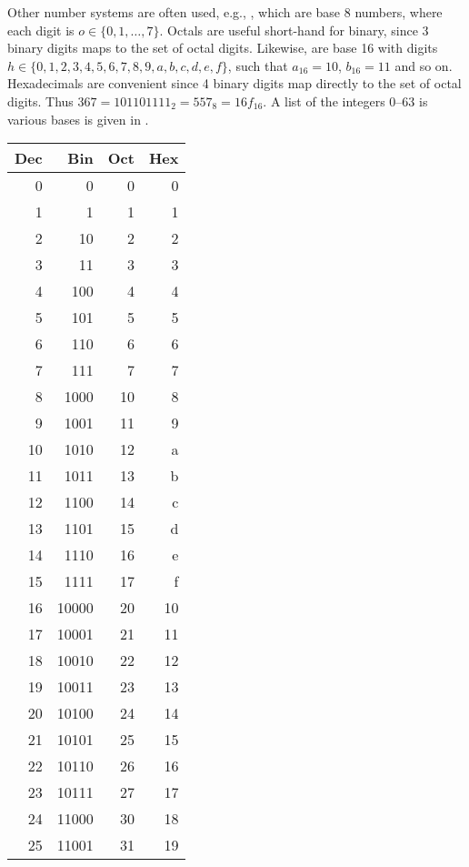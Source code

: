 Other number systems are often used, e.g., , which are base 8 numbers, where each digit is $o\in\{0,1,\ldots,7\}$. Octals are useful short-hand for binary, since 3 binary digits maps to the set of octal digits. Likewise,  are base 16 with digits $h\in\{0,1,2,3,4,5,6,7,8,9,a,b,c,d,e,f\}$, such that $a_{16}=10$, $b_{16}=11$ and so on. Hexadecimals are convenient since 4 binary digits map directly to the set of octal digits. Thus $367 = 101101111_2 = 557_8 = 16f_{16}$. A list of the integers 0--63 is various bases is given in .
\begin{table}
  \centering
  \begin{tabular}{|r|r|r|r|}
    \hline
    \rowcolor{headerRowColor} Dec & Bin & Oct & Hex\\
    \hline
    0 & 0 & 0 & 0\\
    1 & 1 & 1 & 1\\
    2 & 10 & 2 & 2\\
    3 & 11 & 3 & 3 \\
    4 & 100 & 4 & 4\\
    5 & 101 & 5& 5\\
    6 & 110 & 6 & 6 \\
    7 & 111 & 7 & 7 \\
    8 & 1000 & 10 & 8\\
    9 & 1001 & 11 & 9\\
    10 & 1010 & 12 & a\\
    11 & 1011 & 13 & b\\
    12 & 1100 & 14 & c\\
    13 & 1101 & 15 & d\\
    14 & 1110 & 16 & e \\
    15 & 1111 & 17 & f\\
    16 & 10000 & 20 & 10\\
    17 & 10001 & 21 & 11\\
    18 & 10010 & 22 & 12\\
    19 & 10011 & 23 & 13 \\
    20 & 10100 & 24 & 14\\
    21 & 10101 & 25& 15\\
    22 & 10110 & 26 & 16 \\
    23 & 10111 & 27 & 17 \\
    24 & 11000 & 30 & 18\\
    25 & 11001 & 31 & 19\\

\end{tabular}
\end{table}
